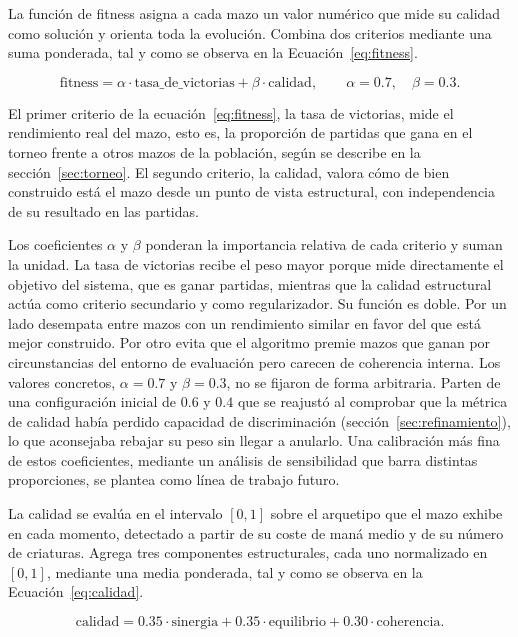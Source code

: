 La función de fitness asigna a cada mazo un valor numérico que mide su calidad como solución y orienta toda la evolución. Combina dos criterios mediante una suma ponderada, tal y como se observa en la Ecuación~\ref{eq:fitness}.

\begin{equation}
\text{fitness} = \alpha \cdot \text{tasa\_de\_victorias} + \beta \cdot \text{calidad},
\qquad \alpha = 0.7,\quad \beta = 0.3.
\label{eq:fitness}
\end{equation}

El primer criterio de la ecuación~\ref{eq:fitness}, la tasa de victorias, mide el rendimiento real del mazo, esto es, la proporción de partidas que gana en el torneo frente a otros mazos de la población, según se describe en la sección~\ref{sec:torneo}. El segundo criterio, la calidad, valora cómo de bien construido está el mazo desde un punto de vista estructural, con independencia de su resultado en las partidas.

Los coeficientes $\alpha$ y $\beta$ ponderan la importancia relativa de cada criterio y suman la unidad. La tasa de victorias recibe el peso mayor porque mide directamente el objetivo del sistema, que es ganar partidas, mientras que la calidad estructural actúa como criterio secundario y como regularizador. Su función es doble. Por un lado desempata entre mazos con un rendimiento similar en favor del que está mejor construido. Por otro evita que el algoritmo premie mazos que ganan por circunstancias del entorno de evaluación pero carecen de coherencia interna. Los valores concretos, $\alpha = 0.7$ y $\beta = 0.3$, no se fijaron de forma arbitraria. Parten de una configuración inicial de $0.6$ y $0.4$ que se reajustó al comprobar que la métrica de calidad había perdido capacidad de discriminación (sección~\ref{sec:refinamiento}), lo que aconsejaba rebajar su peso sin llegar a anularlo. Una calibración más fina de estos coeficientes, mediante un análisis de sensibilidad que barra distintas proporciones, se plantea como línea de trabajo futuro.

La calidad se evalúa en el intervalo $[0, 1]$ sobre el arquetipo que el mazo exhibe en cada momento, detectado a partir de su coste de maná medio y de su número de criaturas. Agrega tres componentes estructurales, cada uno normalizado en $[0, 1]$, mediante una media ponderada, tal y como se observa en la Ecuación~\ref{eq:calidad}.

\begin{equation}
\text{calidad} = 0.35\cdot\text{sinergia} + 0.35\cdot\text{equilibrio} + 0.30\cdot\text{coherencia}.
\label{eq:calidad}
\end{equation}

